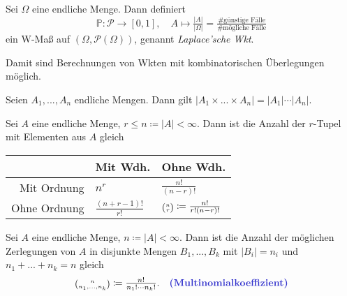\documentclass{cheat-sheet}
\renewcommand{\P}{\mathbb{P}} %
\let\myBinom\binom
\renewcommand{\binom}[2]{\mathsmaller{\myBinom{#1}{#2}}}
\begin{document}
\begin{defn}
  Sei $\Omega$ eine endliche Menge. Dann definiert
  \[ \P : \mathcal{P} \to [0, 1], \quad A \mapsto \tfrac{|A|}{|\Omega|} = \tfrac{\text{\# günstige Fälle}}{\text{\# mögliche Fälle}} \]
  ein W-Maß auf $(\Omega, \mathcal{P}(\Omega))$, genannt \emph{Laplace'sche Wkt}.
\end{defn}

\begin{bem}
  Damit sind Berechnungen von Wkten mit kombinatorischen Überlegungen möglich.
\end{bem}


\begin{lem}
  Seien $A_1, ..., A_n$ endliche Mengen. Dann gilt $| A_1 \times ... \times A_n | = |A_1| \cdots |A_n|$.
\end{lem}

\begin{lem}
  Sei $A$ eine endliche Menge, $r \leq n \coloneqq |A| < \infty$. Dann ist die Anzahl der $r$-Tupel mit Elementen aus $A$ gleich

  \begin{center}
    \begin{tabular}{ r | l l }
      & Mit Wdh. & Ohne Wdh. \\ \hline
      Mit Ordnung & $n^r$ & $\tfrac{n!}{(n-r)!}$ \\
      Ohne Ordnung & $\tfrac{(n+r-1)!}{r!}$ & $\binom{n}{r} \coloneqq \tfrac{n!}{r!(n-r)!}$
    \end{tabular}
  \end{center}
\end{lem}



\begin{lem}
  Sei $A$ eine endliche Menge, $n \coloneqq |A| < \infty$. Dann ist die Anzahl der möglichen Zerlegungen von $A$ in disjunkte Mengen $B_1, ..., B_k$ mit $|B_i| = n_i$ und $n_1 + ... + n_k = n$ gleich
  \[
    \binom{n}{n_1, ..., n_k} \coloneqq \tfrac{n!}{n_1! \cdots n_k!}. \quad \text{\emph{(Multinomialkoeffizient)}}
  \]
\end{lem}



\end{document}
